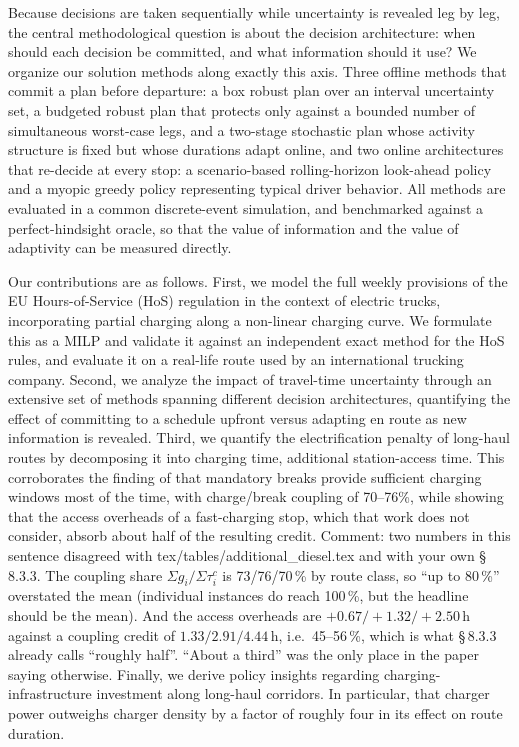 \documentclass[preprint,12pt,3p]{elsarticle}
\newcommand{\green}[1]{{\color{darkgreen}#1}}
\newcommand{\blue}[1]{{\color{darkblue}#1}}
\begin{document}
Because decisions are taken sequentially while uncertainty is revealed leg by leg, the central methodological question is about the decision architecture: when should each decision be committed, and what information should it use? We organize our solution methods along exactly this axis. Three offline methods that commit a plan before departure: a box robust plan over an interval uncertainty set, a budgeted robust plan that protects only against a bounded number of simultaneous worst-case legs, and a two-stage stochastic plan whose activity structure is fixed but whose durations adapt online, and two online architectures that re-decide at every stop: a scenario-based rolling-horizon look-ahead policy and a myopic greedy policy representing typical driver behavior. All methods are evaluated in a common discrete-event simulation, and benchmarked against a perfect-hindsight oracle, so that the value of information and the value of adaptivity can be measured directly.


Our contributions are as follows.
First, we model the full weekly provisions of the EU Hours-of-Service (HoS) regulation in the context of electric trucks, incorporating partial charging along a non-linear charging curve. We formulate this as a MILP and validate it against an independent exact method for the HoS rules, and evaluate it on a real-life route used by an international trucking company.
Second, we analyze the impact of travel-time uncertainty through an extensive set of methods spanning different decision architectures, quantifying the effect of committing to a schedule upfront versus adapting en route as new information is revealed.
Third, we quantify the electrification penalty of long-haul routes by decomposing it into charging time, additional station-access time. This corroborates the finding of \citet{brockmann_break-and-charge_2025} that mandatory breaks provide sufficient charging windows most of the time, with charge/break coupling of \blue{70--76\%}, while showing that the access overheads of a fast-charging stop, which that work does not consider, absorb \blue{about half} of the resulting credit.
\green{Comment: two numbers in this sentence disagreed with
tex/tables/additional\_diesel.tex and with your own \S\,8.3.3. The coupling share $\Sigma g_i/\Sigma\tau^c_i$ is 73/76/70\,\%
by route class, so ``up to 80\,\%'' overstated the mean (individual instances do
reach 100\,\%, but the headline should be the mean). And the access overheads are
$+0.67/+1.32/+2.50$\,h against a coupling credit of $1.33/2.91/4.44$\,h, i.e.\ 45--56\,\%,
which is what \S\,8.3.3 already calls ``roughly half''. ``About a third'' was the only
place in the paper saying otherwise.}
Finally, we derive policy insights regarding charging-infrastructure investment along long-haul corridors. In particular, that charger power outweighs charger density by a factor of roughly four in its effect on route duration.
\end{document}
